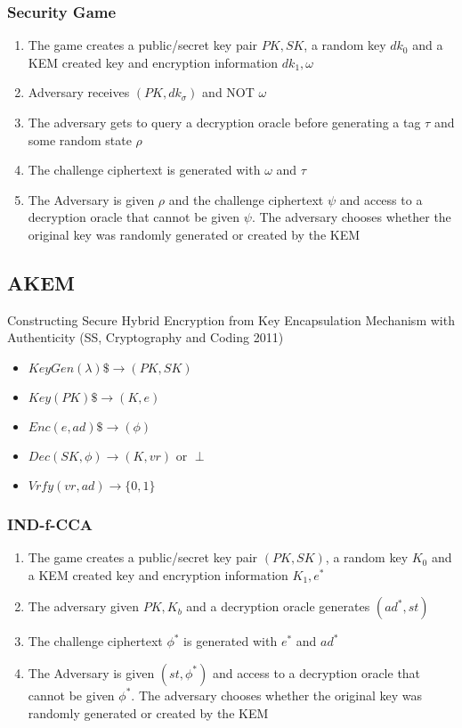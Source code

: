 \documentclass[11pt, pdftex]{article}
\begin{document}
\subsubsection{Security Game}
\begin{enumerate}
\item The game creates a public/secret key pair $PK,SK$, a random key $dk_0$ and a KEM created key and encryption information $dk_1,\omega$
\item Adversary receives $(PK, dk_{\sigma})$ and NOT $\omega$
\item The adversary gets to query a decryption oracle before generating a tag $\tau$ and some random state $\rho$
\item The challenge ciphertext is generated with $\omega$ and $\tau$
\item The Adversary is given $\rho$ and the challenge ciphertext $\psi$ and access to a decryption oracle that cannot be given $\psi$.  The adversary chooses whether the original key was randomly generated or created by the KEM
\end{enumerate}

\subsection{AKEM}
Constructing Secure Hybrid Encryption from Key Encapsulation Mechanism with Authenticity (SS, Cryptography and Coding 2011)
\begin{itemize}
\item $KeyGen(\lambda) \$\rightarrow (PK, SK)$
\item $Key(PK) \$\rightarrow (K, e)$
\item $Enc(e, ad) \$\rightarrow (\phi)$
\item $Dec(SK, \phi) \rightarrow (K, vr) \text{ or }\perp$
\item $Vrfy(vr, ad) \rightarrow \{0,1\}$
\end{itemize}

\subsubsection{IND-f-CCA}

\begin{enumerate}
\item The game creates a public/secret key pair $(PK,SK)$, a random key $K_0$ and a KEM created key and encryption information $K_1,e^*$
\item The adversary given $PK,K_b$ and a decryption oracle generates $(ad^*, st)$
\item The challenge ciphertext $\phi^*$ is generated with $e^*$ and $ad^*$
\item The Adversary is given $(st, \phi^*)$ and access to a decryption oracle that cannot be given $\phi^*$.  The adversary chooses whether the original key was randomly generated or created by the KEM
\end{enumerate}
\end{document}
